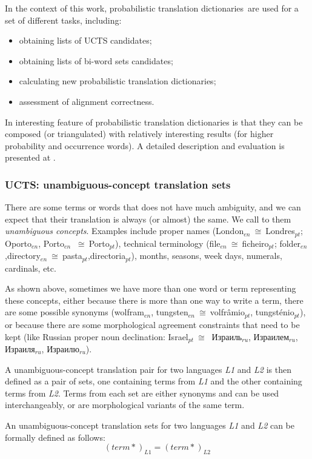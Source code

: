 \documentclass[a4paper,russian,UKenglish]{oasics}
\def\mycong{$\ \cong \ $}
\def\pt{$_{pt}$}
\def\en{$_{en}$}
\def\ru{$_{ru}$}
\def\UC{unambiguous-concept}
\def\UCTS{\UC{} translation sets}
\def\UCTSS{{\sc UCTS}}
\def\PTD{probabilistic translation dictionaries}
\def\BWS{bi-word sets}
\begin{document}
In the context of this work, \PTD\ are used for a set of different
tasks, including:
\begin{itemize}
\item obtaining lists of \UCTSS{} candidates;
\item obtaining lists of \BWS{} candidates;
\item calculating new \PTD;
\item assessment of alignment correctness.
\end{itemize}

In interesting feature of \PTD{} is that they can be composed (or
triangulated) with relatively interesting results (for higher
probability and occurrence words). A detailed description and
evaluation is presented at \cite{fala2010-tri}.

\subsubsection*{UCTS: \UCTS}

There are some terms or words that does not have much ambiguity, and
we can expect that their translation is always (or almost) the
same. We call to them \emph{unambiguous concepts}. Examples include
proper names (London\en \mycong Londres\pt; Oporto\en, Porto\en
\mycong Porto\pt), technical terminology (file\en \mycong ficheiro\pt;
folder\en,directory\en \mycong pasta\pt,directoria\pt), months,
seasons, week days, numerals, cardinals, etc.

As shown above, sometimes we have more than one word or term
representing these concepts, either because there is more than one way
to write a term, there are some possible synonyms (wolfram\en,
tungsten\en \mycong volfrâmio\pt, tungsténio\pt), or because there are
some morphological agreement constraints that need to be kept (like
Russian proper noun declination: Israel\pt \mycong
{  Израиль\ru, Израилем\ru, Израиля\ru,
Израилю\ru )}.


A \UC{} translation pair for two languages \textit{L1} and \textit{L2} is 
then defined as a pair of sets, one containing terms from \textit{L1} and 
the other containing terms from \textit{L2}. Terms from each set are either 
synonyms and can be used interchangeably, or are morphological variants of 
the same term. 

An \UCTS{} for two languages \textit{L1} and \textit{L2} can be 
formally defined as follows:
$$(term*)_{L1} = (term*)_{L2}$$
\end{document}
